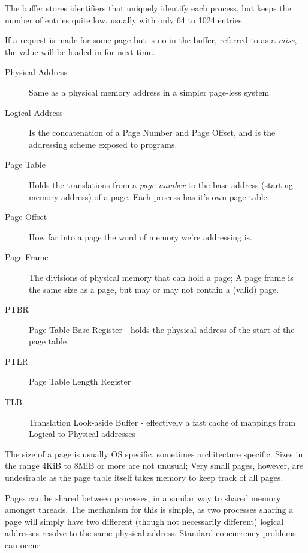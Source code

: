 \documentclass[a4]{article}
\begin{document}
The buffer stores identifiers that uniquely identify each process, but keeps the number of entries quite low, usually with only 64 to 1024 entries.

If a request is made for some page but is no in the buffer, referred to as a \textit{miss}, the value will be loaded in for next time.

\begin{description}
\item[Physical Address] Same as a physical memory address in a simpler page-less system
\item[Logical Address] Is the concatenation of a Page Number and Page Offset, and is the 
addressing scheme exposed to programs.
\item[Page Table] Holds the translations from a \textit{page number} to the base address 
(starting memory address) of a page. Each process has it's own page table.
\item[Page Offset] How far into a page the word of memory we're addressing is.
\item[Page Frame] The divisions of physical memory that can hold a page; A page frame is the same size as a page, but may or may not contain a (valid) page.
\item[PTBR] Page Table Base Register - holds the physical address of the start of the page table
\item[PTLR] Page Table Length Register
\item[TLB] Translation Look-aside Buffer - effectively a fast cache of mappings from Logical to Physical addresses
\end{description}

The size of a page is usually OS specific, sometimes architecture specific. Sizes in the range 4KiB to 8MiB
or more are not unusual; Very small pages, however, are undesirable as the page table itself takes 
memory to keep track of all pages.

Pages can be shared between processes, in a similar way to shared memory amongst threads. The mechanism for this is 
simple, as two processes sharing a page will simply have two different (though not necessarily different) logical 
addresses resolve to the same physical address. Standard concurrency problems can occur. 
\end{document}

